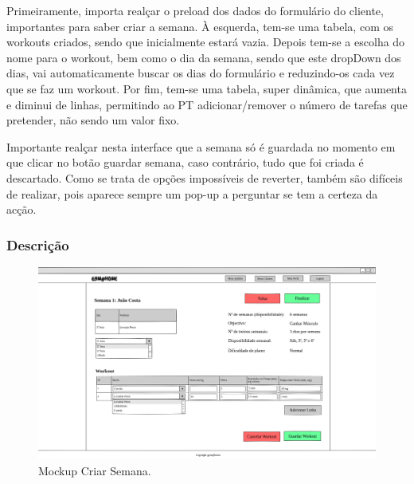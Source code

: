\hspace{5mm} Primeiramente, importa realçar o preload dos dados do formulário do cliente, importantes para saber criar a semana. À esquerda, tem-se uma tabela, com os workouts criados, sendo que inicialmente estará vazia. Depois tem-se a escolha do nome para o workout, bem como o dia da semana, sendo que este dropDown dos dias, vai automaticamente buscar os dias do formulário e reduzindo-os cada vez que se faz um workout. Por fim, tem-se uma tabela, super dinâmica, que aumenta e diminui de linhas, permitindo ao PT adicionar/remover o número de tarefas que pretender, não sendo um valor fixo.

\hspace{5mm} Importante realçar nesta interface que a semana só é guardada no momento em que clicar no botão guardar semana, caso contrário, tudo que foi criada é descartado. Como se trata de opções impossíveis de reverter, também são difíceis de realizar, pois aparece sempre um pop-up a perguntar se tem a certeza da acção.


\subsubsection{Descrição}
\hspace{5mm} 

\begin{figure}[H]
    \centering
    \includegraphics[scale=0.25]{images/mockups/pt_criar_semana.png}
    \caption{Mockup Criar Semana.}
    \label{fig:mockupcriarsemana}
\end{figure}

